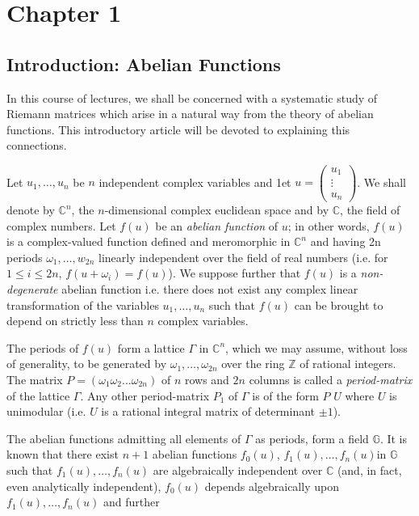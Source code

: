 \chapter{Chapter 1}\label{chap1}

\section{Introduction: Abelian Functions}\pageoriginale 

In this course of lectures, we shall be concerned with a systematic
study of Riemann matrices which arise in a natural way from the theory
of abelian functions. This introductory article will be devoted to
explaining this connections.

Let $u_1,\ldots,u_n$ be $n$ independent complex variables and 1et
$u=\left(\begin{smallmatrix}u_{1}\\ \vdots\\ u_{n}\end{smallmatrix}\right)$. We
shall denote by $\mathbb{C}^n$, the $n$-dimensional complex euclidean
space and by $\mathbb{C}$, the field of complex numbers. Let $f(u)$ be
an {\em abelian function} of $u$; in other words, $f(u)$ is a
complex-valued function defined and meromorphic in $\mathbb{C}^n$ and
having 2n periods $\omega_1,\ldots,w_{2n}$ linearly independent over
the field of real numbers (i.e. for $1\leq i \leq 2n$,
$f(u+\omega_i)=f(u)$). We suppose further that $f(u)$ is a
{\em non-degenerate} abelian function i.e. there does not exist any
complex linear transformation of the variables $u_1,\ldots, u_n$ such
that $f(u)$ can be brought to depend on strictly less than $n$ complex
variables. 

The periods of $f(u)$ form a lattice $\Gamma$ in $\mathbb{C}^n$, which
we may assume, without loss of generality, to be generated by
$\omega_1,\ldots, \omega_{2n}$ over the ring $\mathbb{Z}$ of rational
integers. The matrix $P=(\omega_1\omega_2\ldots \omega_{2n})$ of $n$
rows and $2n$ columns is called a {\em period-matrix} of the
lattice $\Gamma$. Any other period-matrix $P_1$ of $\Gamma$ is of the
form $P$ $U$ where $U$ is unimodular (i.e. $U$ is a rational integral
matrix of determinant $\pm 1$).

The abelian functions admitting all elements of $\Gamma$ as periods,
form a field $\mathbb{G}$. It is known that there exist $n+1$ abelian
functions $f_0(u)$, $f_1(u),\ldots, f_n(u)$\pageoriginale in
$\mathbb{G}$ such that $f_1(u),\ldots,f_n(u)$ are algebraically
independent over $\mathbb{C}$ (and, in fact, even analytically
independent), $f_0(u)$ depends algebraically upon
$f_1(u),\ldots,f_n(u)$ and further

